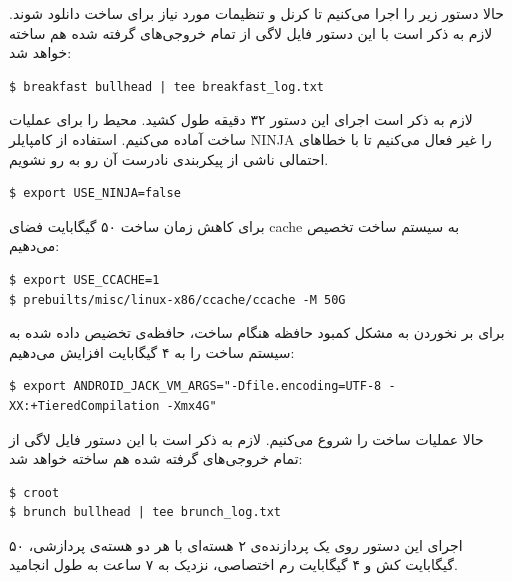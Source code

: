 \documentclass{article}
\begin{document}
حالا دستور زیر را اجرا می‌کنیم تا کرنل و تنظیمات مورد نیاز برای ساخت دانلود شوند. لازم به ذکر است با این دستور فایل لاگی از تمام خروجی‌های گرفته شده هم ساخته خواهد شد:
\begin{latin}
\begin{verbatim}
$ breakfast bullhead | tee breakfast_log.txt
\end{verbatim}
\end{latin}
لازم به ذکر است اجرای این دستور ۳۲ دقیقه طول کشید.
محیط را برای عملیات ساخت آماده می‌کنیم. 
استفاده از کامپایلر NINJA را غیر فعال می‌کنیم تا با خطا‌های احتمالی ناشی از پیکربندی نادرست آن رو به رو نشویم.

\begin{latin}
\begin{verbatim}
$ export USE_NINJA=false
\end{verbatim}
\end{latin}

برای کاهش زمان ساخت ۵۰ گیگابایت فضای cache به سیستم ساخت تخصیص می‌دهیم:
\begin{latin}
\begin{verbatim}
$ export USE_CCACHE=1
$ prebuilts/misc/linux-x86/ccache/ccache -M 50G
\end{verbatim}
\end{latin}
برای بر نخوردن به مشکل کمبود حافظه هنگام ساخت، حافظه‌ی تخضیص داده شده به سیستم ساخت را به ۴ گیگابایت افزایش می‌دهیم:
\begin{latin}
\begin{verbatim}
$ export ANDROID_JACK_VM_ARGS="-Dfile.encoding=UTF-8 -XX:+TieredCompilation -Xmx4G"
\end{verbatim}
\end{latin}
حالا عملیات ساخت را شروع می‌کنیم. لازم به ذکر است با این دستور فایل لاگی از تمام خروجی‌های گرفته شده هم ساخته خواهد شد:
\begin{latin}
\begin{verbatim}
$ croot
$ brunch bullhead | tee brunch_log.txt
\end{verbatim}
\end{latin}
اجرای این دستور روی یک پردازنده‌ی ۲ هسته‌ای   با هر دو هسته‌ی پردازشی، ۵۰ گیگابایت کش و ۴ گیگابایت رم اختصاصی، نزدیک به ۷ ساعت به طول انجامید.
\end{document}
